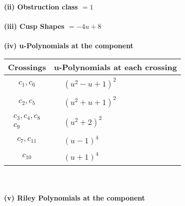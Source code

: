 \documentclass[1p]{elsarticle_modified}
\theoremstyle{definition}
\begin{document}
\flushleft \textbf{(ii) Obstruction class $= 1$}\\~\\
\flushleft \textbf{(iii) Cusp Shapes $= -4 u+8$}\\~\\
\newpage\renewcommand{\arraystretch}{1}
\flushleft \textbf{(iv) u-Polynomials at the component}\newline \\
\begin{tabular}{m{50pt}|m{274pt}}
Crossings & \hspace{64pt}u-Polynomials at each crossing \\
\hline $$\begin{aligned}c_{1},c_{6}\end{aligned}$$&$\begin{aligned}
&(u^2- u+1)^2
\end{aligned}$\\
\hline $$\begin{aligned}c_{2},c_{5}\end{aligned}$$&$\begin{aligned}
&(u^2+u+1)^2
\end{aligned}$\\
\hline $$\begin{aligned}c_{3},c_{4},c_{8}\\c_{9}\end{aligned}$$&$\begin{aligned}
&(u^2+2)^2
\end{aligned}$\\
\hline $$\begin{aligned}c_{7},c_{11}\end{aligned}$$&$\begin{aligned}
&(u-1)^4
\end{aligned}$\\
\hline $$\begin{aligned}c_{10}\end{aligned}$$&$\begin{aligned}
&(u+1)^4
\end{aligned}$\\
\hline
\end{tabular}\\~\\
\newpage\renewcommand{\arraystretch}{1}
\flushleft \textbf{(v) Riley Polynomials at the component}\newline \\
\end{document}
